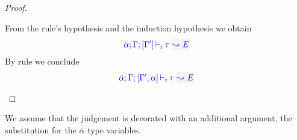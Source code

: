 \begin{proof}
\begin{description}
From the rule's hypothesis and the induction hypothesis we obtain
\begin{equation*}
  \dlres{\bar{\alpha}}{\tenv}{\tenv'}{\type}{E}
\end{equation*}
By rule  we conclude
\begin{equation*}
  \dlres{\bar{\alpha}}{\tenv}{\tenv',\alpha}{\type}{E}
\end{equation*}
\end{description}
\end{proof}

We assume that the judgement is decorated with an additional argument, the substitution
for the $\bar{\alpha}$ type variables.

{\centering
{}}

